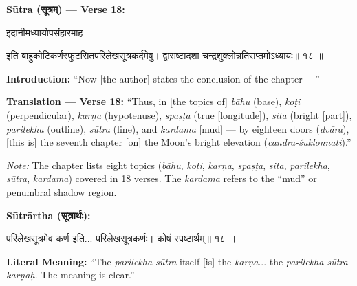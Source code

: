 \documentclass[11pt,a4paper]{article}
\newcommand{\dev}[1]{{\devanagarifont #1}}
\newenvironment{sanskritverse}{%
  \begin{center}\begin{minipage}{0.95\textwidth}
  \setlength{\leftskip}{1em}
  \setlength{\rightskip}{1em}
  \dev
}{\end{minipage}\end{center}}
\newenvironment{paracol}[1]{\begingroup}{\endgroup}
\newcommand{\switchcolumn}[1][]{%
  \ifnum#1=0\relax\else\par\nobreak\vspace{0.5em}\par\nobreak\fi%
}
\begin{document}
\vspace{0.5em}
\noindent\textbf{Sūtra (\dev{सूत्रम्}) — Verse 18:}

\begin{paracol}{2}

\begin{sanskritverse}
इदानीमध्यायोपसंहारमाह—
\end{sanskritverse}

\begin{sanskritverse}
इति बाहुकोटिकर्णस्फुटसितपरिलेखसूत्रकर्दमेषु।
द्वाराष्टादशा चन्द्रशुक्लोन्नतिसप्तमोऽध्यायः॥ १८ ॥
\end{sanskritverse}

\switchcolumn

\textbf{Introduction:} ``Now [the author] states the conclusion of the chapter ---''

\textbf{Translation — Verse 18:} ``Thus, in [the topics of] \textit{bāhu} (base), \textit{koṭi} (perpendicular), \textit{karṇa} (hypotenuse), \textit{spaṣṭa} (true [longitude]), \textit{sita} (bright [part]), \textit{parilekha} (outline), \textit{sūtra} (line), and \textit{kardama} [mud] --- by eighteen doors (\textit{dvāra}), [this is] the seventh chapter [on] the Moon's bright elevation (\textit{candra-śuklonnati}).''

\textit{Note:} The chapter lists eight topics (\textit{bāhu}, \textit{koṭi}, \textit{karṇa}, \textit{spaṣṭa}, \textit{sita}, \textit{parilekha}, \textit{sūtra}, \textit{kardama}) covered in 18 verses. The \textit{kardama} refers to the ``mud'' or penumbral shadow region.

\end{paracol}

\vspace{0.5em}

\begin{paracol}{2}

\noindent\textbf{Sūtrārtha (\dev{सूत्रार्थः}):}
\begin{sanskritverse}
परिलेखसूत्रमेव कर्ण इति... परिलेखसूत्रकर्णः। कोषं स्पष्टार्थम्॥ १८ ॥
\end{sanskritverse}

\switchcolumn

\textbf{Literal Meaning:} ``The \textit{parilekha-sūtra} itself [is] the \textit{karṇa}... the \textit{parilekha-sūtra-karṇaḥ}. The meaning is clear.''

\end{paracol}
\end{document}
